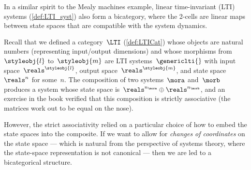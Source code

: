 \begin{example}
    \label{exa:bicat-lti}
    In a similar spirit to the Mealy machines example, linear time-invariant (LTI) systems (\cref{def:LTI_syst}) also form a bicategory, where the 2-cells are linear maps between state spaces that are compatible with the system dynamics.

    Recall that we defined a category~$\LTI$ (\cref{def:LTICat}) whose objects are natural numbers (representing input/output dimensions) and whose morphisms from~$\styleobj{l}$ to~$\styleobj{m}$ are LTI systems~$\genericlti{}$ with input space~$\reals^\styleobj{l}$, output space~$\reals^\styleobj{m}$, and state space~$\reals^n$ for some~$n$.
    The composition of two systems~$\mora$ and~$\morb$ produces a system whose state space is~$\reals^{n_\mora} \oplus \reals^{n_\morb}$, and an exercise in the book verified that this composition is strictly associative (the matrices work out to be equal on the nose).

    However, the strict associativity relied on a particular choice of how to embed the state spaces into the composite.
    If we want to allow for \emph{changes of coordinates} on the state space --- which is natural from the perspective of systems theory, where the state-space representation is not canonical --- then we are led to a bicategorical structure.


\end{example}
